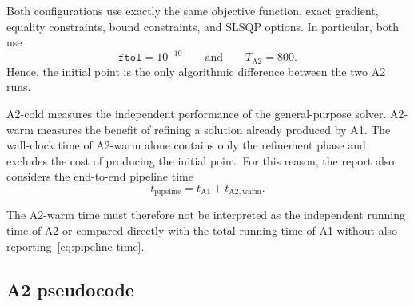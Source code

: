 \documentclass[12pt]{article}
\begin{document}
Both configurations use exactly the same objective function, exact
gradient, equality constraints, bound constraints, and SLSQP options.
In particular, both use
\[
\texttt{ftol}=10^{-10}
\qquad\text{and}\qquad
T_{\mathrm{A2}}=800.
\]
Hence, the initial point is the only algorithmic difference between
the two A2 runs.

A2-cold measures the independent performance of the general-purpose
solver. A2-warm measures the benefit of refining a solution already
produced by A1. The wall-clock time of A2-warm alone contains only the
refinement phase and excludes the cost of producing the initial point.
For this reason, the report also considers the end-to-end pipeline
time
\begin{equation}
t_{\mathrm{pipeline}}
=
t_{\mathrm{A1}} + t_{\mathrm{A2,warm}}.
\label{eq:pipeline-time}
\end{equation}

The A2-warm time must therefore not be interpreted as the independent
running time of A2 or compared directly with the total running time of
A1 without also reporting~\eqref{eq:pipeline-time}.

\subsection{A2 pseudocode}
\end{document}
